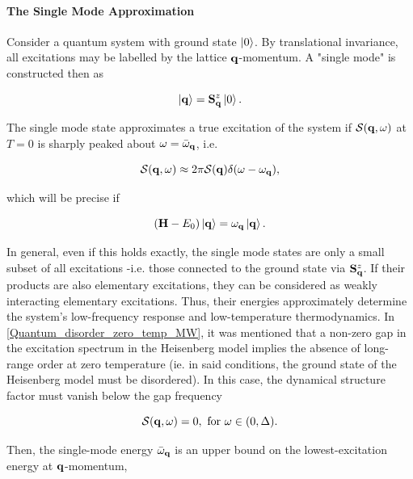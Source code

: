 \documentclass{homework}
\begin{document}
\paragraph{The Single Mode Approximation}

Consider a quantum system with ground state $\ket{0}$. By translational invariance, all excitations may be labelled by the lattice ${\bf q}$-momentum. A "single mode" is constructed then as 

\begin{equation}
    \ket{{\bf q}} = {\bf S}^z_{{\bf q}} \ket{0}.
\end{equation}

The single mode state approximates a true excitation of the system if $\mathcal{S}({\bf q}, \omega)$ at $T = 0$ is sharply peaked about $\omega = \bar{\omega}_{\bf q}$, i.e.

\begin{equation}
    \mathcal{S}({\bf q}, \omega) \approx 2\pi \mathcal{S}({\bf q}) \delta(\omega- \omega_{\bf q}),
\end{equation}

which will be precise if 

\begin{equation}
    ({\bf H} - E_0)\ket{{\bf q}} = \omega_{{\bf q}} \ket{{\bf q}}.
\end{equation}

In general, even if this holds exactly, the single mode states are only a small subset of all excitations -i.e. those connected to the ground state via ${\bf S}^z_{\bf q}$. If their products are also elementary excitations, they can be considered as weakly interacting elementary excitations. Thus, their energies approximately determine the system's low-frequency response and low-temperature thermodynamics. In \cref{Quantum_disorder_zero_temp_MW}, it was mentioned that a non-zero gap in the excitation spectrum in the Heisenberg model implies the absence of long-range order at zero temperature (ie. in said conditions, the ground state of the Heisenberg model must be disordered). In this case, the dynamical structure factor must vanish below the gap frequency 

\begin{equation}
    \mathcal{S}({\bf q}, \omega) = 0, \textnormal{ for } \omega \in (0, \Delta).
\end{equation}

Then, the single-mode energy $\bar{\omega}_{{\bf q}}$ is an upper bound on the lowest-excitation energy at ${\bf q}$-momentum,
\end{document}
